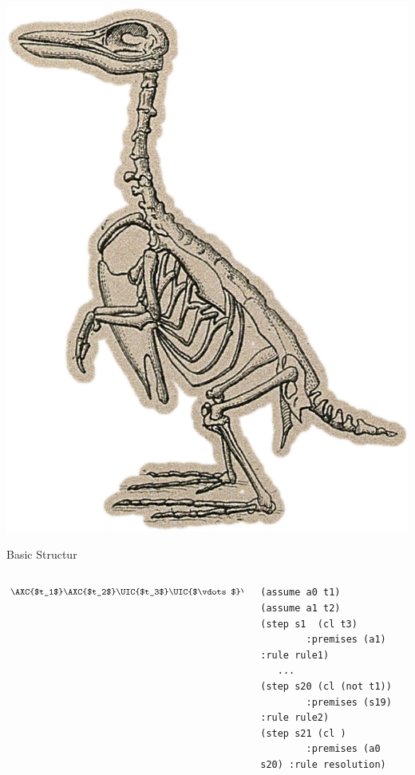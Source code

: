 \documentclass[aspectratio=169,compress]{beamer}
\begin{document}
\begin{frame}[plain]
    \begin{center}
        \includegraphics[scale=0.25]{skeleton}
    \end{center}
\end{frame}

\begin{frame}[fragile]{Basic Structur}
    \begin{columns}
        \begin{column}{0.4\textwidth}
{\Large
\[
    \AXC{$t_1$}
    \AXC{$t_2$}
    \UIC{$t_3$}
    \noLine
    \UIC{$\vdots$}
    \noLine
    \UIC{$\neg t_1$}
    \RightLabel{\normalsize\texttt{resolution}}
    \BIC{
        $\bot$
    }
    \DP
\]
}
        \end{column}
        \begin{column}{0.6\textwidth}
            \begin{center}
\begin{verbatim}
(assume a0 t1)
(assume a1 t2)
(step s1  (cl t3)
        :premises (a1)     :rule rule1)
   ...
(step s20 (cl (not t1))
        :premises (s19)    :rule rule2)
(step s21 (cl )
        :premises (a0 s20) :rule resolution)

\end{verbatim}

            \end{center}
        \end{column}
    \end{columns}
\end{frame}
\end{document}
